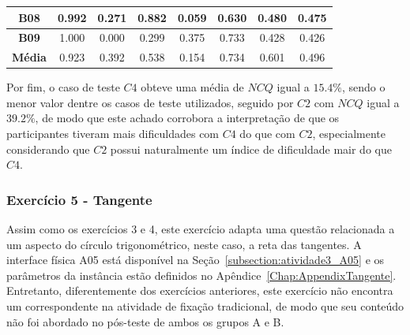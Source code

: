 \begin{table}[htbp]
\begin{tabular}{|c|cccccc|c|}
		\rowcolor[HTML]{E7E6E6} 
		\textbf{B08} & \multicolumn{1}{c|}{\cellcolor[HTML]{E7E6E6}0.992} & \multicolumn{1}{c|}{\cellcolor[HTML]{E7E6E6}0.271} & \multicolumn{1}{c|}{\cellcolor[HTML]{E7E6E6}0.882} & \multicolumn{1}{c|}{\cellcolor[HTML]{E7E6E6}0.059} & \multicolumn{1}{c|}{\cellcolor[HTML]{E7E6E6}0.630} & 0.480 & 0.475 \\ \hline
		\rowcolor[HTML]{FFFFFF} 
		\textbf{B09} & \multicolumn{1}{c|}{\cellcolor[HTML]{FFFFFF}1.000} & \multicolumn{1}{c|}{\cellcolor[HTML]{FFFFFF}0.000} & \multicolumn{1}{c|}{\cellcolor[HTML]{FFFFFF}0.299} & \multicolumn{1}{c|}{\cellcolor[HTML]{FFFFFF}0.375} & \multicolumn{1}{c|}{\cellcolor[HTML]{FFFFFF}0.733} & 0.428 & 0.426 \\ \hline
		\rowcolor[HTML]{D9D9D9} 
		\textbf{Média} & \multicolumn{1}{c|}{\cellcolor[HTML]{D9D9D9}0.923} & \multicolumn{1}{c|}{\cellcolor[HTML]{D9D9D9}0.392} & \multicolumn{1}{c|}{\cellcolor[HTML]{D9D9D9}0.538} & \multicolumn{1}{c|}{\cellcolor[HTML]{D9D9D9}0.154} & \multicolumn{1}{c|}{\cellcolor[HTML]{D9D9D9}0.734} & 0.601 & 0.496 \\ \hline
	\end{tabular}
	\label{tab:F3_A4_NCQ}
\end{table}

Por fim, o caso de teste $C4$ obteve uma média de $NCQ$ igual a $15.4\%$, sendo o menor valor dentre os casos de teste utilizados, seguido por $C2$ com $NCQ$ igual a $39.2\%$, de modo que este achado corrobora a interpretação de que os participantes tiveram mais dificuldades com $C4$ do que com $C2$, especialmente considerando que $C2$ possui naturalmente um índice de dificuldade mair do que $C4$.

\subsubsection{Exercício 5 - Tangente}\label{subsubsec:F3A5}

Assim como os exercícios 3 e 4, este exercício adapta uma questão relacionada a um aspecto do círculo trigonométrico, neste caso, a reta das tangentes. A interface física A05 está disponível na Seção~\ref{subsection:atividade3_A05} e os parâmetros da instância estão definidos no Apêndice~\ref{Chap:AppendixTangente}. Entretanto, diferentemente dos exercícios anteriores, este exercício não encontra um correspondente na atividade de fixação tradicional, de modo que seu conteúdo não foi abordado no pós-teste de ambos os grupos A e B.

